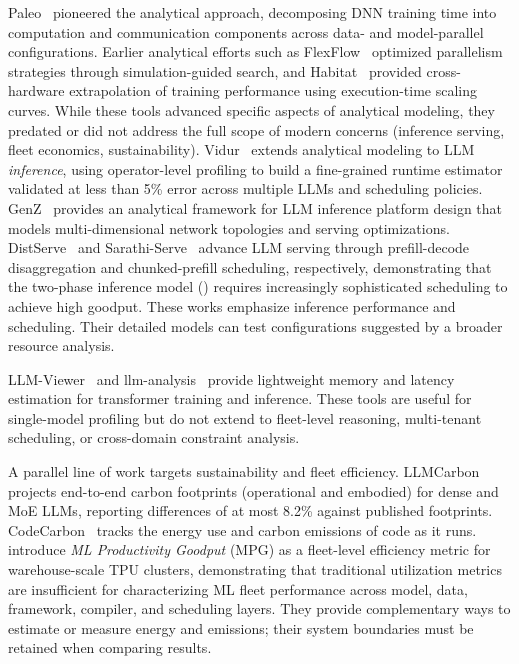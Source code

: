 \documentclass[10pt,twocolumn]{article}
\begin{document}
Paleo~\citep{qi2017paleo} pioneered the analytical approach, decomposing DNN training time into computation and communication components across data- and model-parallel configurations. Earlier analytical efforts such as FlexFlow~\citep{jia2019flexflow} optimized parallelism strategies through simulation-guided search, and Habitat~\citep{yu2021habitat} provided cross-hardware extrapolation of training performance using execution-time scaling curves. While these tools advanced specific aspects of analytical modeling, they predated or did not address the full scope of modern concerns (inference serving, fleet economics, sustainability). Vidur~\citep{agrawal2024vidur} extends analytical modeling to LLM \emph{inference}, using operator-level profiling to build a fine-grained runtime estimator validated at less than 5\% error across multiple LLMs and scheduling policies. GenZ~\citep{bambhaniya2024genz} provides an analytical framework for LLM inference platform design that models multi-dimensional network topologies and serving optimizations. DistServe~\citep{zhong2024distserve} and Sarathi-Serve~\citep{agrawal2025} advance LLM serving through prefill-decode disaggregation and chunked-prefill scheduling, respectively, demonstrating that the two-phase inference model () requires increasingly sophisticated scheduling to achieve high goodput. These works emphasize inference performance and scheduling. Their detailed models can test configurations suggested by a broader resource analysis.

LLM-Viewer~\citep{yuan2024llmviewer} and llm-analysis~\citep{li2023llmanalysis} provide lightweight memory and latency estimation for transformer training and inference. These tools are useful for single-model profiling but do not extend to fleet-level reasoning, multi-tenant scheduling, or cross-domain constraint analysis.

A parallel line of work targets sustainability and fleet efficiency. LLMCarbon~\citep{faiz2024llmcarbon} projects end-to-end carbon footprints (operational and embodied) for dense and MoE LLMs, reporting differences of at most 8.2\% against published footprints. CodeCarbon~\citep{codecarbon2024} tracks the energy use and carbon emissions of code as it runs. \citet{wongpanich2025fleet} introduce \emph{ML Productivity Goodput} (MPG) as a fleet-level efficiency metric for warehouse-scale TPU clusters, demonstrating that traditional utilization metrics are insufficient for characterizing ML fleet performance across model, data, framework, compiler, and scheduling layers. They provide complementary ways to estimate or measure energy and emissions; their system boundaries must be retained when comparing results.
\end{document}
